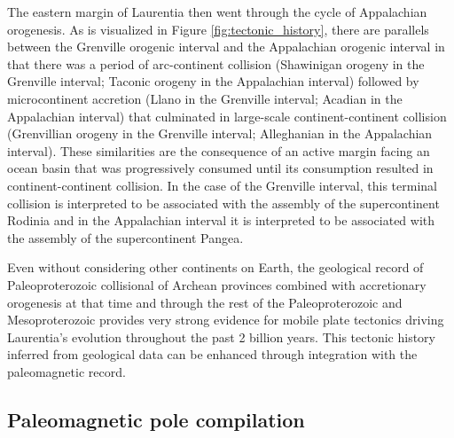 \documentclass[11pt,letterpaper]{article}
\begin{document}
The eastern margin of Laurentia then went through the cycle of Appalachian orogenesis. As is visualized in Figure \ref{fig:tectonic_history}, there are parallels between the Grenville orogenic interval and the Appalachian orogenic interval in that there was a period of arc-continent collision (Shawinigan orogeny in the Grenville interval; Taconic orogeny in the Appalachian interval) followed by microcontinent accretion (Llano in the Grenville interval; Acadian in the Appalachian interval) that culminated in large-scale continent-continent collision (Grenvillian orogeny in the Grenville interval; Alleghanian in the Appalachian interval). These similarities are the consequence of an active margin facing an ocean basin that was progressively consumed until its consumption resulted in continent-continent collision. In the case of the Grenville interval, this terminal collision is interpreted to be associated with the assembly of the supercontinent Rodinia and in the Appalachian interval it is interpreted to be associated with the assembly of the supercontinent Pangea.

Even without considering other continents on Earth, the geological record of Paleoproterozoic collisional of Archean provinces combined with accretionary orogenesis at that time and through the rest of the Paleoproterozoic and Mesoproterozoic provides very strong evidence for mobile plate tectonics driving Laurentia's evolution throughout the past 2 billion years. This tectonic history inferred from geological data can be enhanced through integration with the paleomagnetic record.

\subsection{Paleomagnetic pole compilation}
\end{document}
